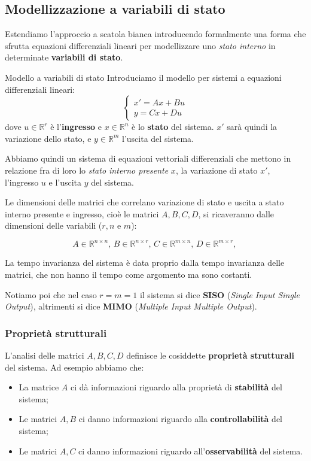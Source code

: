 \documentclass[a4paper,11pt]{article}
\begin{document}
\subsection{Modellizzazione a variabili di stato}
Estendiamo l'approccio a scatola bianca introducendo formalmente una forma che sfrutta equazioni differenziali lineari per modellizzare uno \textit{stato interno} in determinate \textbf{variabili di stato}.

\begin{definition}{Modello a variabili di stato}
	Introduciamo il modello per sistemi a equazioni differenziali lineari:
	\[
		\begin{cases}
			x' = Ax + Bu \\ 
			y = Cx + Du
		\end{cases}
	\]
	dove $u \in \mathbb{R}^r$ è l'\textbf{ingresso} e $x \in \mathbb{R}^n$ è lo \textbf{stato} del sistema.
	$x'$ sarà quindi la variazione dello stato, e $y \in \mathbb{R}^m$ l'uscita del sistema.
\end{definition}

Abbiamo quindi un sistema di equazioni vettoriali differenziali che mettono in relazione fra di loro lo \textit{stato interno presente} $x$, la variazione di stato $x'$, l'ingresso $u$ e l'uscita $y$ del sistema.

Le dimensioni delle matrici che correlano variazione di stato e uscita a stato interno presente e ingresso, cioè le matrici $A, B, C, D$, si ricaveranno dalle dimensioni delle variabili ($r, n$ e $m$):

$$
A \in \mathbb{R}^{n \times n}, \, 
B \in \mathbb{R}^{n \times r}, \, 
C \in \mathbb{R}^{m \times n}, \, 
D \in \mathbb{R}^{m \times r}, \, 
$$

La tempo invarianza del sistema è data proprio dalla tempo invarianza delle matrici, che non hanno il tempo come argomento ma sono costanti.

Notiamo poi che nel caso $r = m = 1$ il sistema si dice \textbf{SISO} (\textit{Single Input Single Output}), altrimenti si dice \textbf{MIMO} (\textit{Multiple Input Multiple Output}).

\subsubsection{Proprietà strutturali}
L'analisi delle matrici $A, B, C, D$ definisce le cosiddette \textbf{proprietà strutturali} del sistema.
Ad esempio abbiamo che:
\begin{itemize}
	\item La matrice $A$ ci dà informazioni riguardo alla proprietà di \textbf{stabilità} del sistema;
	\item Le matrici $A, B$ ci danno informazioni riguardo alla \textbf{controllabilità} del sistema;
	\item Le matrici $A, C$ ci danno informazioni riguardo all'\textbf{osservabilità} del sistema.
\end{itemize}
\end{document}
